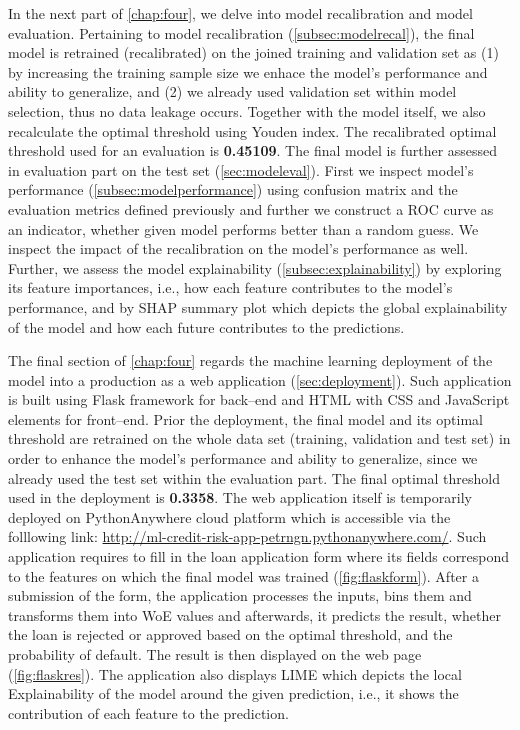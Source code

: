 In the next part of \autoref{chap:four}, we delve into model recalibration and model evaluation.
Pertaining to model recalibration (\autoref{subsec:modelrecal}), the final model is retrained (recalibrated) on the joined training and validation set as (1) by increasing the training sample size we enhace the model's performance and ability to generalize, and (2) we already used validation set within model selection, thus no data leakage occurs. Together with the model itself, we also recalculate the optimal threshold using Youden index.
The recalibrated optimal threshold used for an evaluation is \textbf{0.45109}.
The final model is further assessed in evaluation part on the test set (\autoref{sec:modeleval}).
First we inspect model's performance (\autoref{subsec:modelperformance}) using confusion matrix and the evaluation metrics defined previously and further we construct a ROC curve as an indicator, whether given model performs better than a random guess.
We inspect the impact of the recalibration on the model's performance as well.
Further, we assess the model explainability (\autoref{subsec:explainability}) by exploring its feature importances, i.e., how each feature contributes to the model's performance, and by SHAP summary plot which depicts the global explainability of the model and how each future contributes to the predictions.

The final section of \autoref{chap:four} regards the machine learning deployment of the model into a production as a web application (\autoref{sec:deployment}).
Such application is built using Flask framework for back--end and HTML with CSS and JavaScript elements for front--end.
Prior the deployment, the final model and its optimal threshold are retrained on the whole data set (training, validation and test set) in order to enhance the model's performance and ability to generalize, since we already used the test set within the evaluation part. The final optimal threshold used in the deployment is \textbf{0.3358}.
The web application itself is temporarily deployed on PythonAnywhere cloud platform which is accessible via the folllowing link: \url{http://ml-credit-risk-app-petrngn.pythonanywhere.com/}.
Such application requires to fill in the loan application form where its fields correspond to the features on which the final model was trained (\autoref{fig:flaskform}). After a submission of the form, the application processes the inputs, bins them and transforms them into WoE values and afterwards, it predicts the result, whether the loan is rejected or approved based on the optimal threshold, and the probability of default. The result is then displayed on the web page (\autoref{fig:flaskres}).
The application also displays LIME which depicts the local Explainability of the model around the given prediction, i.e., it shows the contribution of each feature to the prediction.

